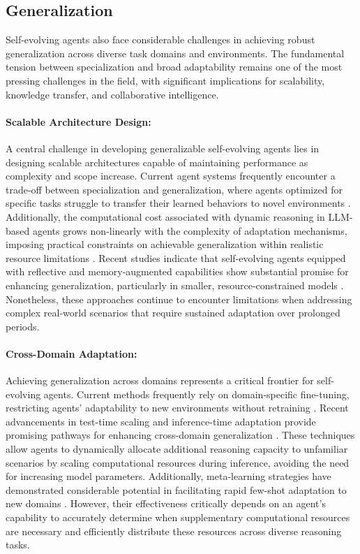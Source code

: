 \subsection{Generalization}

Self-evolving agents also face considerable challenges in achieving robust generalization across diverse task domains and environments. The fundamental tension between specialization and broad adaptability remains one of the most pressing challenges in the field, with significant implications for scalability, knowledge transfer, and collaborative intelligence.

\paragraph{Scalable Architecture Design:} A central challenge in developing generalizable self-evolving agents lies in designing scalable architectures capable of maintaining performance as complexity and scope increase. Current agent systems frequently encounter a trade-off between specialization and generalization, where agents optimized for specific tasks struggle to transfer their learned behaviors to novel environments \citep{chen2024optima}. Additionally, the computational cost associated with dynamic reasoning in LLM-based agents grows non-linearly with the complexity of adaptation mechanisms, imposing practical constraints on achievable generalization within realistic resource limitations \citep{kim2025cost}. Recent studies indicate that self-evolving agents equipped with reflective and memory-augmented capabilities show substantial promise for enhancing generalization, particularly in smaller, resource-constrained models \citep{liang2024sage}. Nonetheless, these approaches continue to encounter limitations when addressing complex real-world scenarios that require sustained adaptation over prolonged periods.



\paragraph{Cross-Domain Adaptation:} Achieving generalization across domains represents a critical frontier for self-evolving agents. Current methods frequently rely on domain-specific fine-tuning, restricting agents' adaptability to new environments without retraining \citep{belle2025agents}. Recent advancements in test-time scaling and inference-time adaptation provide promising pathways for enhancing cross-domain generalization \citep{snell2024scaling, zhang2025survey}. These techniques allow agents to dynamically allocate additional reasoning capacity to unfamiliar scenarios by scaling computational resources during inference, avoiding the need for increasing model parameters. Additionally, meta-learning strategies have demonstrated considerable potential in facilitating rapid few-shot adaptation to new domains \citep{bilal2025meta}. However, their effectiveness critically depends on an agent's capability to accurately determine when supplementary computational resources are necessary and efficiently distribute these resources across diverse reasoning tasks.

